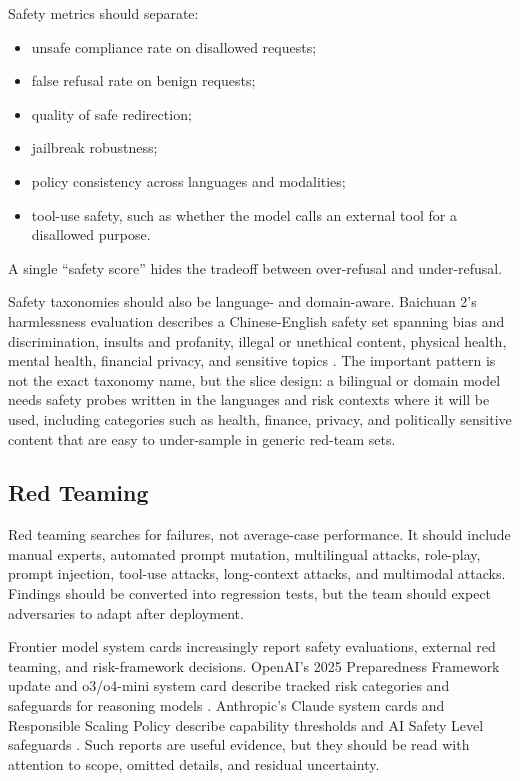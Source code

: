 Safety metrics should separate:
\begin{itemize}
    \item unsafe compliance rate on disallowed requests;
    \item false refusal rate on benign requests;
    \item quality of safe redirection;
    \item jailbreak robustness;
    \item policy consistency across languages and modalities;
    \item tool-use safety, such as whether the model calls an external tool for a disallowed purpose.
\end{itemize}
A single ``safety score'' hides the tradeoff between over-refusal and under-refusal.

Safety taxonomies should also be language- and domain-aware. Baichuan 2's harmlessness evaluation describes a Chinese-English safety set spanning bias and discrimination, insults and profanity, illegal or unethical content, physical health, mental health, financial privacy, and sensitive topics \cite{yang2023baichuan2}. The important pattern is not the exact taxonomy name, but the slice design: a bilingual or domain model needs safety probes written in the languages and risk contexts where it will be used, including categories such as health, finance, privacy, and politically sensitive content that are easy to under-sample in generic red-team sets.

\subsection{Red Teaming}
Red teaming searches for failures, not average-case performance. It should include manual experts, automated prompt mutation, multilingual attacks, role-play, prompt injection, tool-use attacks, long-context attacks, and multimodal attacks. Findings should be converted into regression tests, but the team should expect adversaries to adapt after deployment.

Frontier model system cards increasingly report safety evaluations, external red teaming, and risk-framework decisions. OpenAI's 2025 Preparedness Framework update and o3/o4-mini system card describe tracked risk categories and safeguards for reasoning models \cite{openai2025preparedness,openai2025o3o4mini}. Anthropic's Claude system cards and Responsible Scaling Policy describe capability thresholds and AI Safety Level safeguards \cite{anthropic2025claude4,anthropic2026rspv3}. Such reports are useful evidence, but they should be read with attention to scope, omitted details, and residual uncertainty.


